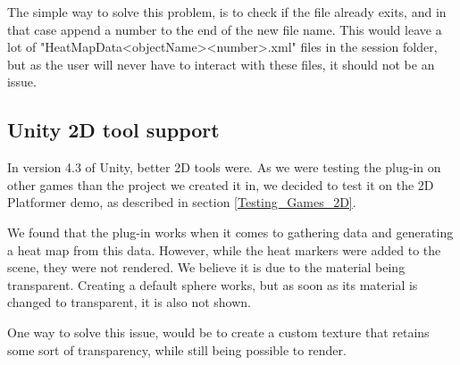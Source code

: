 The simple way to solve this problem, is to check if the file already exits, and in that case append a number to the end of the new file name. This would leave a lot of "HeatMapData<objectName><number>.xml" files in the session folder, but as the user will never have to interact with these files, it should not be an issue.

\subsection{Unity 2D tool support}
\label{Issues_2DSupport}

In version 4.3 of Unity, better 2D tools were. As we were testing the plug-in on other games than the project we created it in, we decided to test it on the 2D Platformer demo, as described in section \ref{Testing_Games_2D}.

We found that the plug-in works when it comes to gathering data and generating a heat map from this data. However, while the heat markers were added to the scene, they were not rendered. We believe it is due to the material being transparent. Creating a default sphere works, but as soon as its material is changed to transparent, it is also not shown.

One way to solve this issue, would be to create a custom texture that retains some sort of transparency, while still being possible to render.
